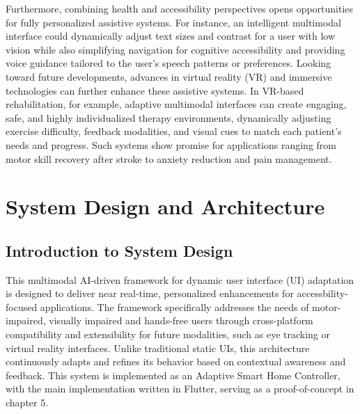 \documentclass[openany]{book}
\begin{document}
Furthermore, combining health and accessibility perspectives opens opportunities for fully personalized assistive systems. For instance, an intelligent multimodal interface could dynamically adjust text sizes and contrast for a user with low vision while also simplifying navigation for cognitive accessibility and providing voice guidance tailored to the user's speech patterns or preferences. Looking toward future developments, advances in virtual reality (VR) and immersive technologies can further enhance these assistive systems. In VR-based rehabilitation, for example, adaptive multimodal interfaces can create engaging, safe, and highly individualized therapy environments, dynamically adjusting exercise difficulty, feedback modalities, and visual cues to match each patient’s needs and progress. Such systems show promise for applications ranging from motor skill recovery after stroke to anxiety reduction and pain management.

\chapter{System Design and Architecture}
\section{Introduction to System Design}
This multimodal AI-driven framework for dynamic user interface (UI) adaptation is designed to deliver near real-time, personalized enhancements for accessbility-focused applications. The framework specifically addresses the needs of motor-impaired, visually impaired and hands-free users through cross-platform compatibility and extensibility for future modalities, such as eye tracking or virtual reality interfaces. Unlike traditional static UIs, this architecture continuously adapts and refines its behavior based on contextual awareness and feedback. This system is implemented as an Adaptive Smart Home Controller, with the main implementation written in Flutter, serving as a proof-of-concept in chapter 5.
\end{document}
